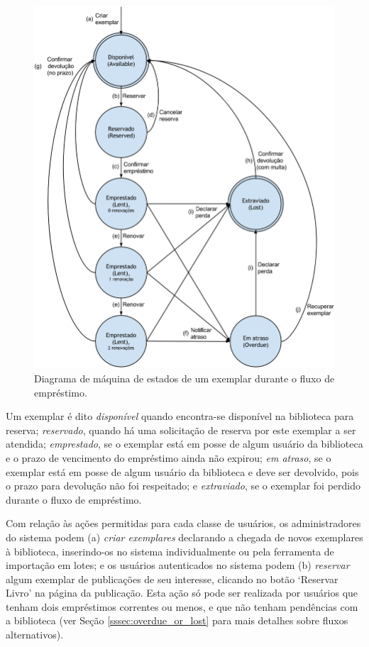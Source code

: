 \documentclass[a4paper]{article}
\begin{document}
\begin{figure}[pbth!]
\centering
\includegraphics[width=140mm]{img/workflow.png}
\caption{Diagrama de máquina de estados de um exemplar durante o fluxo de empréstimo.\label{workflow}}
\end{figure}

Um exemplar é dito \textit{disponível} quando encontra-se disponível na biblioteca para reserva; \textit{reservado}, quando há uma solicitação de reserva por este exemplar a ser atendida; \textit{emprestado}, se o exemplar está em posse de algum usuário da biblioteca e o prazo de vencimento do empréstimo ainda não expirou; \textit{em atraso}, se o exemplar está em posse de algum usuário da biblioteca e deve ser devolvido, pois o prazo para devolução não foi respeitado; e \textit{extraviado}, se o exemplar foi perdido durante o fluxo de empréstimo.

Com relação às ações permitidas para cada classe de usuários, os administradores do sistema podem (a) \textit{criar exemplares} declarando a chegada de novos exemplares à biblioteca, inserindo-os no sistema individualmente ou pela ferramenta de importação em lotes; e os usuários autenticados no sistema podem (b) \textit{reservar} algum exemplar de publicações de seu interesse, clicando no botão ‘Reservar Livro’ na página da publicação. Esta ação só pode ser realizada por usuários que tenham dois empréstimos correntes ou menos, e que não tenham pendências com a biblioteca (ver Seção \ref{sssec:overdue_or_lost} para mais detalhes sobre fluxos alternativos).
\end{document}
